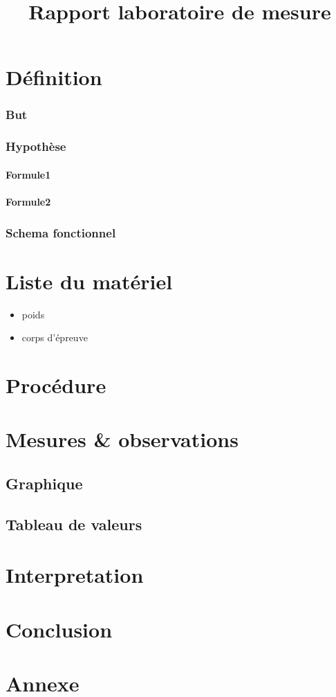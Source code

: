 \documentclass[11pt,a4paper]{report}
\begin{document}
\title{Rapport laboratoire de mesure}


\chapter{Définition}	
\subsection{But}
\subsection{Hypothèse}
\subsubsection{Formule1}
\subsubsection{Formule2}
\subsection{Schema fonctionnel}

\chapter{Liste du matériel}
\begin{itemize}
\item poids 
\item corps d'épreuve
\end{itemize}	

\chapter{Procédure}

\chapter{Mesures \& observations}
\section{Graphique}
\section{Tableau de valeurs}

	
\chapter{Interpretation}	
\chapter{Conclusion}	
\chapter{Annexe}	
\end{document}
